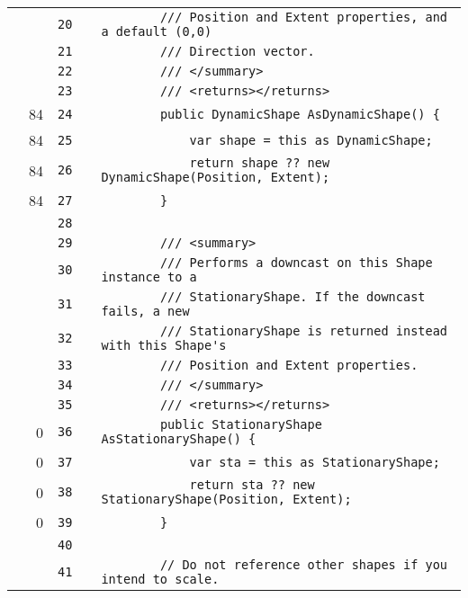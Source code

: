 \documentclass[a4paper,landscape,10pt]{article}
\begin{document}
\begin{longtable}[l]{lrrll}
\cellcolor{gray} &  & \verb~20~ & & \verb~        /// Position and Extent properties, and a default (0,0)~\\
\cellcolor{gray} &  & \verb~21~ & & \verb~        /// Direction vector.~\\
\cellcolor{gray} &  & \verb~22~ & & \verb~        /// </summary>~\\
\cellcolor{gray} &  & \verb~23~ & & \verb~        /// <returns></returns>~\\
\cellcolor{green} & 84 & \verb~24~ & & \verb~        public DynamicShape AsDynamicShape() {~\\
\cellcolor{green} & 84 & \verb~25~ & & \verb~            var shape = this as DynamicShape;~\\
\cellcolor{orange} & 84 & \verb~26~ & & \verb~            return shape ?? new DynamicShape(Position, Extent);~\\
\cellcolor{green} & 84 & \verb~27~ & & \verb~        }~\\
\cellcolor{gray} &  & \verb~28~ & & \verb~~\\
\cellcolor{gray} &  & \verb~29~ & & \verb~        /// <summary>~\\
\cellcolor{gray} &  & \verb~30~ & & \verb~        /// Performs a downcast on this Shape instance to a~\\
\cellcolor{gray} &  & \verb~31~ & & \verb~        /// StationaryShape. If the downcast fails, a new~\\
\cellcolor{gray} &  & \verb~32~ & & \verb~        /// StationaryShape is returned instead with this Shape's~\\
\cellcolor{gray} &  & \verb~33~ & & \verb~        /// Position and Extent properties.~\\
\cellcolor{gray} &  & \verb~34~ & & \verb~        /// </summary>~\\
\cellcolor{gray} &  & \verb~35~ & & \verb~        /// <returns></returns>~\\
\cellcolor{red} & 0 & \verb~36~ & & \verb~        public StationaryShape AsStationaryShape() {~\\
\cellcolor{red} & 0 & \verb~37~ & & \verb~            var sta = this as StationaryShape;~\\
\cellcolor{red} & 0 & \verb~38~ & & \verb~            return sta ?? new StationaryShape(Position, Extent);~\\
\cellcolor{red} & 0 & \verb~39~ & & \verb~        }~\\
\cellcolor{gray} &  & \verb~40~ & & \verb~~\\
\cellcolor{gray} &  & \verb~41~ & & \verb~        // Do not reference other shapes if you intend to scale.~\\

\end{longtable}
\end{document}
